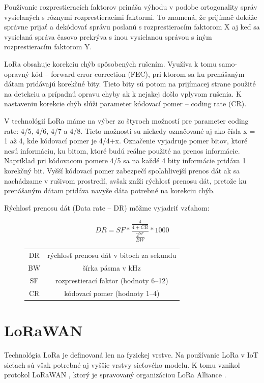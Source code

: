 \documentclass[slovak,master]{diploma}
\begin{document}
Používanie rozprestieracích faktorov prináša výhodu v podobe ortogonality správ vysielaných s rôznymi rozprestieracími faktormi. 
To znamená, že prijímač dokáže správne prijať a dekódovať správu poslanú s rozprestieracím faktorom X aj 
keď sa vysielaná správa časovo prekrýva s inou vysielanou správou s iným rozprestieracím faktorom Y.

LoRa obsahuje korekciu chýb spôsobených rušením. Využíva k tomu samo-opravný kód -- forward error correction (FEC), pri ktorom 
sa ku prenášaným dátam pridávajú korekčné bity. Tieto bity sú potom na prijímacej strane použité na detekciu a prípadnú opravu chyby ak k nejakej došlo vplyvom rušenia.
K nastaveniu korekcie chýb slúži parameter kódovací pomer -- coding rate (CR).

V technológií LoRa máme na výber zo štyroch možností pre parameter coding rate: 4/5, 4/6, 4/7 a 4/8. 
Tieto možnosti su niekedy označované aj ako čísla x = 1 až 4, kde kódovací pomer je 4/4+x.
Označenie vyjadruje pomer bitov, ktoré nesú informáciu, ku bitom, ktoré budú reálne použité na prenos informácie. 
Napríklad pri kódovacom pomere 4/5 sa na každé 4 bity informácie pridáva 1 korekčný bit.
Vyšší kódovací pomer zabezpečí spoľahlivejší prenos dát ak sa nachádzame v rušivom prostredí, avšak zníži rýchlosť prenosu dát, 
pretože ku prenášaným dátam pridáva navyše dáta potrebné na korekciu chýb.

Rýchlosť prenosu dát (Data rate -- DR) môžme vyjadriť vzťahom:
\begin{figure}[h!]
  \centering
  \[DR = SF * \frac{\frac{4}{4+CR}}{\frac{2^{SF}}{BW}} *1000 \]
  \begin{tabular}{c c}
    DR & rýchlosť prenosu dát v bitoch za sekundu\\
    BW & šírka pásma v kHz \\
    SF & rozprestierací faktor (hodnoty 6--12) \\
    CR & kódovací pomer (hodnoty 1--4) \\
  \end{tabular}
\end{figure}

\section{LoRaWAN}
Technológia LoRa je definovaná len na fyzickej vrstve. Na používanie LoRa v IoT sieťach sú však potrebné aj vyššie vrstvy sieťového modelu.
K tomu vznikol protokol LoRaWAN \cite{lorawan}, ktorý je spravovaný organizáciou LoRa Alliance \cite{lora}.
\end{document}

